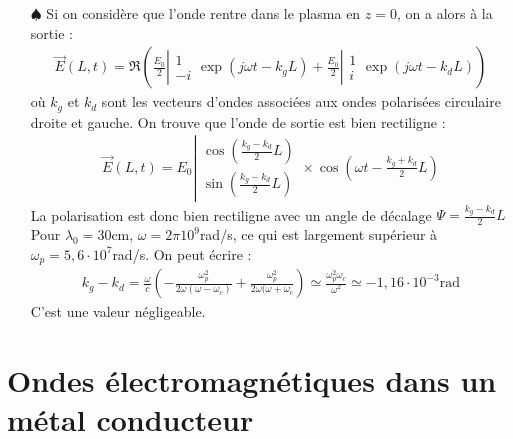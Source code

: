 \documentclass{report}
\newcommand*{\vect}[2]{
	\ensuremath{
    \left\lvert 
      \begin{matrix} 
        #1\\ 
        #2 
      \end{matrix}  
    \right.
  }}
\begin{document}
\begin{itemize}
	\item[$\spadesuit$] Si on considère que l'onde rentre dans le plasma en $z=0$, on a alors à la sortie :
	\begin{align*}
		\vec{E}(L,t)=\Re\left(\frac{E_0}{2}\vect{1}{-i}\exp (j\omega t-k_gL) + \frac{E_0}{2}\vect{1}{i}\exp (j\omega t-k_dL) \right)
	\end{align*}
	où $k_g$ et $k_d$ sont les vecteurs d'ondes associées aux ondes polarisées circulaire droite et gauche. On trouve que l'onde de sortie est bien rectiligne :
		\begin{align*}
		\vec{E}(L,t)=E_0\vect{\cos\left( \frac{k_g-k_d}{2}L\right) }{\sin\left( \frac{k_g-k_d}{2}L\right) }\times\cos\left( \omega t - \frac{k_g+k_d}{2}L\right) 
	\end{align*}
	La polarisation est donc bien rectiligne avec un angle de décalage $\Psi=\frac{k_g-k_d}{2}L$
	Pour $\lambda_0=30$cm, $\omega=2\pi10^9$rad/s, ce qui est largement supérieur à $\omega_p=5,6\cdot10^7$rad/s. On peut écrire :
	\begin{align*}
		k_g-k_d=\frac{\omega}{c}\left(-\frac{\omega_p^2}{2\omega(\omega-\omega_c)}+ \frac{\omega_p^2}{2\omega(\omega+\omega_c}\right) \simeq \frac{\omega_p^2\omega_c}{\omega^2}\simeq-1,16\cdot10^{-3}\mathrm{rad}
	\end{align*}
	C'est une valeur négligeable. 
	
	
	
\end{itemize}

\newpage

\section*{Ondes électromagnétiques dans un métal conducteur}
\end{document}
